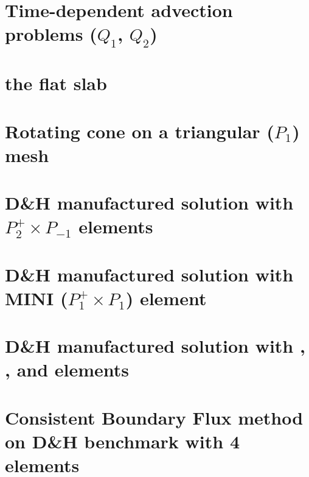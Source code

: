 \documentclass[a4paper,11pt]{report}
\begin{document}
\chapter{Time-dependent advection problems ($Q_1$, $Q_2$)\label{f43}} %

\chapter{the flat slab \label{f44}} %

\chapter{Rotating cone on a triangular ($P_1$) mesh\label{f45}} %

\chapter{D\&H manufactured solution with $P_2^+\times P_{-1}$ elements \label{f46}} %

\chapter{D\&H manufactured solution with MINI ($P_1^+\times P_1$) element \label{f47}} %

\chapter{D\&H manufactured solution with \QonePzero, \QtwoQone, \QthreeQtwo and \QfourQthree elements \label{f48}} %

\chapter{Consistent Boundary Flux method on D\&H benchmark with 4 elements \label{f49}} %
\end{document}
